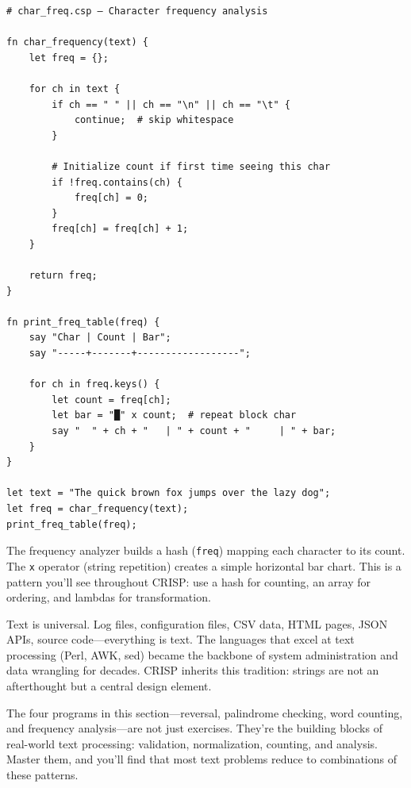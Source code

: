 \begin{tcolorbox}[colback=codebg, colframe=darkpurple, colbacktitle=darkpurple, title=\textbf{\textcolor{codegold}{Character Frequency (char\_freq.csp)}}, fonttitle=\bfseries, sharp corners]
\begin{lstlisting}
# char_freq.csp — Character frequency analysis

fn char_frequency(text) {
    let freq = {};

    for ch in text {
        if ch == " " || ch == "\n" || ch == "\t" {
            continue;  # skip whitespace
        }

        # Initialize count if first time seeing this char
        if !freq.contains(ch) {
            freq[ch] = 0;
        }
        freq[ch] = freq[ch] + 1;
    }

    return freq;
}

fn print_freq_table(freq) {
    say "Char | Count | Bar";
    say "-----+-------+------------------";

    for ch in freq.keys() {
        let count = freq[ch];
        let bar = "█" x count;  # repeat block char
        say "  " + ch + "   | " + count + "     | " + bar;
    }
}

let text = "The quick brown fox jumps over the lazy dog";
let freq = char_frequency(text);
print_freq_table(freq);
\end{lstlisting}
\end{tcolorbox}

The frequency analyzer builds a hash (\texttt{freq}) mapping each character to its count. The \texttt{x} operator (string repetition) creates a simple horizontal bar chart. This is a pattern you'll see throughout CRISP: use a hash for counting, an array for ordering, and lambdas for transformation.

\begin{tcolorbox}[colback=lightlavender, colframe=softvioletdark, title=\textbf{\textcolor{darkpurple}{Why String Processing Matters}}, fonttitle=\bfseries, sharp corners]
Text is universal. Log files, configuration files, CSV data, HTML pages, JSON APIs, source code—everything is text. The languages that excel at text processing (Perl, AWK, sed) became the backbone of system administration and data wrangling for decades. CRISP inherits this tradition: strings are not an afterthought but a central design element.

The four programs in this section—reversal, palindrome checking, word counting, and frequency analysis—are not just exercises. They're the building blocks of real-world text processing: validation, normalization, counting, and analysis. Master them, and you'll find that most text problems reduce to combinations of these patterns.
\end{tcolorbox}
